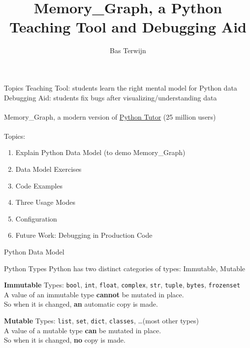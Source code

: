 \documentclass[10pt, colorlinks=true, urlcolor=blue]{beamer}
\title{Memory\_Graph, a Python Teaching Tool and Debugging Aid}
\author{Bas Terwijn}
\date{}
\begin{document}
\begin{frame}
    \titlepage
\end{frame}

\begin{frame}{Topics}
  Teaching Tool: students learn the right mental model for Python data \\
  Debugging Aid: students fix bugs after visualizing/understanding data \\
  \\
  Memory\_Graph, a modern version of \href{https://pythontutor.com/}{Python Tutor} (25 million users)\\
  \\
  Topics:
  \begin{enumerate}
    \item Explain Python Data Model (to demo Memory\_Graph)
    \item Data Model Exercises
    \item Code Examples
    \item Three Usage Modes
    \item Configuration
    \item Future Work: Debugging in Production Code
  \end{enumerate}
\end{frame}

\begin{frame}{Python Data Model}
  \begin{block}{Python Types}
    Python has two distinct categories of types: Immutable, Mutable
  \end{block}
  
  \vspace{2.4em}
  
  \textbf{Immutable} Types: \texttt{bool}, \texttt{int}, \texttt{float}, \texttt{complex}, \texttt{str}, \texttt{tuple}, \texttt{bytes}, \texttt{frozenset} \\
  
  \vspace{-0.8em}
  A value of an immutable type \textbf{cannot} be mutated in place. \\
  So when it is changed, \textbf{an} automatic copy is made. \\
  
  \vspace{2.0em}
  
  \textbf{Mutable} Types: \texttt{list}, \texttt{set}, \texttt{dict}, \texttt{classes}, \dots (most other types) \\
  
  \vspace{-0.8em}
  A value of a mutable type \textbf{can} be mutated in place. \\
  So when it is changed, \textbf{no} copy is made.
\end{frame}
\end{document}
